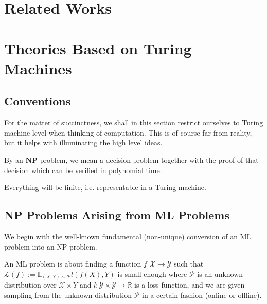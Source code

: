 \documentclass[9pt, oneside]{article}   	%
\theoremstyle{definition}
\begin{document}
\section{Related Works}



\section{Theories Based on Turing Machines}

\subsection{Conventions}

For the matter of succinctness, we shall in this section restrict ourselves to Turing machine level when thinking of computation. This is of course far from reality, but it helps with illuminating the high level ideas.

By an $\textbf{NP}$ problem, we mean a decision problem together with the proof of that decision which can be verified in polynomial time.

Everything will be finite, i.e. representable in a Turing machine.

\subsection{NP Problems Arising from ML Problems}
\begin{center}
\end{center}

We begin with the well-known fundamental (non-unique) conversion of an ML problem into an NP problem.

An ML problem is about finding a function $f$ $\mathcal{X}\to \mathcal{Y}$ such that $\mathscr{L}(f):=\mathbb{E}_{(X,Y)\sim \mathcal{P}}l(f(X), Y)$ is small enough where $\mathcal{P}$ is an unknown distribution over $\mathcal{X}\times Y$ and $l:\mathcal{Y}\times \mathcal{Y} \to \mathbb{R}$ is a loss function, and we are given sampling from the unknown distribution $\mathcal{P}$ in a certain fashion (online or offline).
\end{document}

